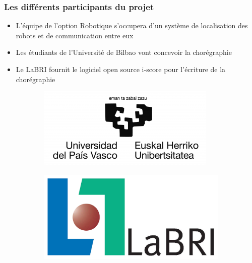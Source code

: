 \documentclass[10pt]{beamer}
\begin{document}
\begin{frame}
	\frametitle{Les différents participants du projet}
    \begin{itemize}
   		\item L'équipe de l'option Robotique s'occupera d'un système de localisation des robots et de communication entre eux
        \item Les étudiants de l'Université de Bilbao vont concevoir la chorégraphie
        \item Le LaBRI fournit le logiciel open source i-score pour l'écriture de la chorégraphie
	\end{itemize}
    
\begin{figure}[B]
\centering
\begin{subfigure}{.4\textwidth}
  \centering
  \includegraphics[scale=0.5]{bilbao}
\end{subfigure}
\hspace*{1cm}
\begin{subfigure}{.4\textwidth}
  \centering
  \includegraphics[scale=0.3]{labri}
\end{subfigure}
\end{figure}

\end{frame}
\end{document}
